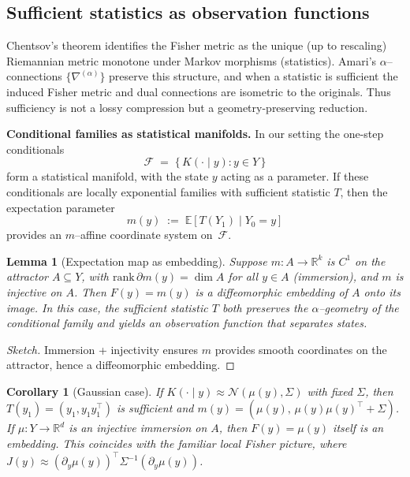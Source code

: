 \documentclass[11pt]{article}
\newtheorem{lemma}{Lemma}
\newtheorem{corollary}{Corollary}
\newcommand{\1}{\mathbf{1}}
\begin{document}
\subsection{Sufficient statistics as observation functions}

Chentsov's theorem identifies the Fisher metric as the unique (up to rescaling) 
Riemannian metric monotone under Markov morphisms (statistics). 
Amari's $\alpha$--connections $\{\nabla^{(\alpha)}\}$ preserve this structure, 
and when a statistic is sufficient the induced Fisher metric and dual connections 
are isometric to the originals. Thus sufficiency is not a lossy compression but a 
geometry-preserving reduction.

\medskip

\noindent\textbf{Conditional families as statistical manifolds.}
In our setting the one-step conditionals 
\[
\mathcal F \;=\;\{\,K(\cdot\mid y): y\in Y\,\}
\]
form a statistical manifold, with the state $y$ acting as a parameter. 
If these conditionals are locally exponential families with sufficient statistic 
$T$, then the expectation parameter
\[
m(y) \;:=\; \mathbb E[T(Y_1)\mid Y_0=y]
\]
provides an $m$--affine coordinate system on~$\mathcal F$.

\begin{lemma}[Expectation map as embedding]
Suppose $m:A\to\mathbb R^k$ is $C^1$ on the attractor $A\subseteq Y$, 
with $\mathrm{rank}\,\partial m(y)=\dim A$ for all $y\in A$ (immersion), 
and $m$ is injective on $A$. Then $F(y)=m(y)$ is a diffeomorphic embedding of 
$A$ onto its image. In this case, the sufficient statistic $T$ both preserves the 
$\alpha$--geometry of the conditional family and yields an observation function 
that separates states.
\end{lemma}

\begin{proof}[Sketch]
Immersion + injectivity ensures $m$ provides smooth coordinates 
on the attractor, hence a diffeomorphic embedding.
\end{proof}

\begin{corollary}[Gaussian case]
If $K(\cdot\mid y)\approx \mathcal N(\mu(y),\Sigma)$ with fixed $\Sigma$, then 
$T(y_1)=(y_1,y_1y_1^\top)$ is sufficient and 
$m(y)=(\mu(y),\,\mu(y)\mu(y)^\top+\Sigma)$. 
If $\mu:Y\to\mathbb R^d$ is an injective immersion on $A$, then $F(y)=\mu(y)$ 
itself is an embedding. This coincides with the familiar local Fisher picture, 
where $J(y)\approx (\partial_y\mu(y))^\top\Sigma^{-1}(\partial_y\mu(y))$.
\end{corollary}
\end{document}
